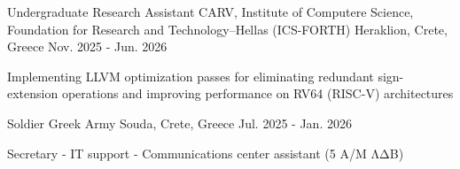

\begin{cventries}

  \cventry
    {Undergraduate Research Assistant} %
    {CARV, Institute of Computere Science, Foundation for Research and Technology–Hellas (ICS-FORTH)} %
    {Heraklion, Crete, Greece} %
    {Nov. 2025 - Jun. 2026} %
    {
      \begin{cvitems} %
        \item {Implementing LLVM optimization passes for eliminating redundant sign-extension operations and improving performance on RV64 (RISC-V) architectures}
      \end{cvitems}
    }

  \cventry
    {Soldier} %
    {Greek Army} %
    {Souda, Crete, Greece} %
    {Jul. 2025 - Jan. 2026} %
    {
      \begin{cvitems} %
        \item {Secretary - IT support -  Communications center assistant (5 Α/Μ ΛΔΒ)}
      \end{cvitems}
    }

\end{cventries}
